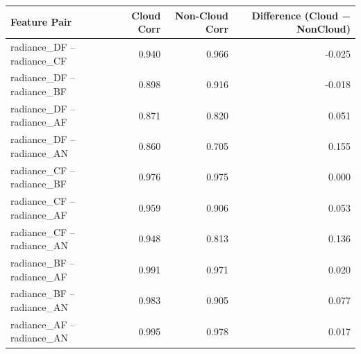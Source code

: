 \begin{tabular}{lrrr}
\toprule
Feature Pair & Cloud Corr & Non-Cloud Corr & Difference (Cloud − NonCloud) \\
\midrule
radiance_DF – radiance_CF & 0.940 & 0.966 & -0.025 \\
radiance_DF – radiance_BF & 0.898 & 0.916 & -0.018 \\
radiance_DF – radiance_AF & 0.871 & 0.820 & 0.051 \\
radiance_DF – radiance_AN & 0.860 & 0.705 & 0.155 \\
radiance_CF – radiance_BF & 0.976 & 0.975 & 0.000 \\
radiance_CF – radiance_AF & 0.959 & 0.906 & 0.053 \\
radiance_CF – radiance_AN & 0.948 & 0.813 & 0.136 \\
radiance_BF – radiance_AF & 0.991 & 0.971 & 0.020 \\
radiance_BF – radiance_AN & 0.983 & 0.905 & 0.077 \\
radiance_AF – radiance_AN & 0.995 & 0.978 & 0.017 \\
\bottomrule
\end{tabular}
